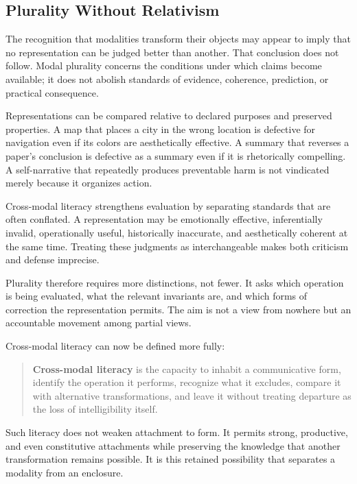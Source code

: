 \documentclass[11pt]{article}
\begin{document}
\subsection{Plurality Without Relativism}

The recognition that modalities transform their objects may appear to imply
that no representation can be judged better than another. That conclusion
does not follow. Modal plurality concerns the conditions under which claims
become available; it does not abolish standards of evidence, coherence,
prediction, or practical consequence.

Representations can be compared relative to declared purposes and preserved
properties. A map that places a city in the wrong location is defective for
navigation even if its colors are aesthetically effective. A summary that
reverses a paper's conclusion is defective as a summary even if it is
rhetorically compelling. A self-narrative that repeatedly produces preventable
harm is not vindicated merely because it organizes action.

Cross-modal literacy strengthens evaluation by separating standards that are
often conflated. A representation may be emotionally effective, inferentially
invalid, operationally useful, historically inaccurate, and aesthetically
coherent at the same time. Treating these judgments as interchangeable makes
both criticism and defense imprecise.

Plurality therefore requires more distinctions, not fewer. It asks which
operation is being evaluated, what the relevant invariants are, and which
forms of correction the representation permits. The aim is not a view from
nowhere but an accountable movement among partial views.

Cross-modal literacy can now be defined more fully:

\begin{quote}
\textbf{Cross-modal literacy} is the capacity to inhabit a communicative form,
identify the operation it performs, recognize what it excludes, compare it
with alternative transformations, and leave it without treating departure as
the loss of intelligibility itself.
\end{quote}

Such literacy does not weaken attachment to form. It permits strong,
productive, and even constitutive attachments while preserving the knowledge
that another transformation remains possible. It is this retained possibility
that separates a modality from an enclosure.
\end{document}
